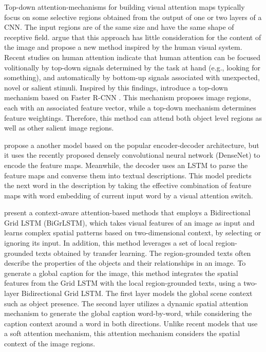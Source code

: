 Top-down attention-mechanisms for building visual attention maps typically focus on some selective regions obtained from the output of one or two layers of a CNN. The input regions are of the same size and have the same shape of receptive field. \citet{Anderson2018_BUTD} argue that this approach has little consideration for the content  of the image and propose a new method inspired by the human visual system. Recent studies on human attention \citep{Buschman2007} indicate that human attention can be focused volitionally by top-down signals determined by the task at hand (e.g., looking for something), and automatically by bottom-up signals associated with unexpected, novel or salient stimuli. Inspired by this findings, \citeauthor{Anderson2018_BUTD} introduce a top-down mechanism based on Faster R-CNN \citet{Ren2015}. This mechanism proposes image regions, each with an associated feature vector, while a top-down mechanism determines feature weightings. Therefore, this method can attend both object level regions as well as other salient image regions. 

\citet{Hao2018} propose a another model based on the popular encoder-decoder architecture, but it uses the recently proposed densely convolutional neural network (DenseNet) to encode the feature maps. Meanwhile, the decoder uses an LSTM to parse the feature maps and converse them into textual descriptions. This model predicts the next word in the description by taking the effective combination of feature maps with word embedding of current input word by a visual attention switch.

\citet{Khademi2018} present a context-aware attention-based methods that employs a Bidirectional Grid LSTM (BiGrLSTM), which takes visual features of an image as input and learns complex spatial patterns based on two-dimensional context, by selecting or ignoring its input. In addition, this method leverages a set of local region-grounded texts obtained by transfer learning. The region-grounded texts often describe the properties of the objects and their relationships in an image. To generate a global caption for the image, this method integrates the spatial features from the Grid LSTM with the local region-grounded texts, using a two-layer Bidirectional Grid LSTM. The first layer models the global scene context such as object presence. The second layer utilizes a dynamic spatial attention mechanism to generate the global caption word-by-word, while considering the caption context around a word in both directions. Unlike recent models that use a soft attention mechanism, this attention mechanism considers the spatial context of the image regions.

